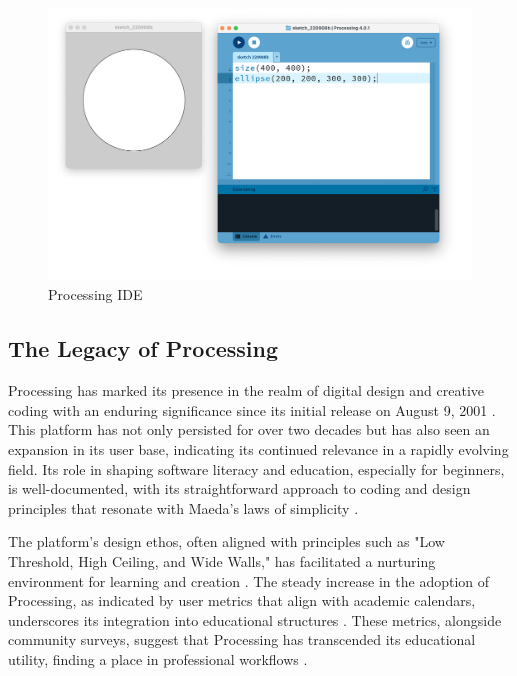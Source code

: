 
\begin{figure}
    \includegraphics[width=1\textwidth]{images/processing_ide.png} 
    \caption{Processing IDE \parencite{reasProcessingIDE2015}}
    \label{fig:processing_ide_screenshot}
  \end{figure}

\subsection{The Legacy of Processing} %

Processing has marked its presence in the realm of digital design and creative coding with an enduring significance since its initial release on August 9, 2001 \parencite{processingfoundation20thAnniversaryProcessing2022}. This platform has not only persisted for over two decades but has also seen an expansion in its user base, indicating its continued relevance in a rapidly evolving field. Its role in shaping software literacy and education, especially for beginners, is well-documented, with its straightforward approach to coding and design principles that resonate with Maeda’s laws of simplicity \parencite{JohnMaedaLaws2020}.

The platform's design ethos, often aligned with principles such as "Low Threshold, High Ceiling, and Wide Walls," has facilitated a nurturing environment for learning and creation \parencite{resnickDesignPrinciplesTools}. The steady increase in the adoption of Processing, as indicated by user metrics that align with academic calendars, underscores its integration into educational structures \parencite{fryModernPrometheusHistory2018}. These metrics, alongside community surveys, suggest that Processing has transcended its educational utility, finding a place in professional workflows \parencite{2016CommunitySurvey}.

